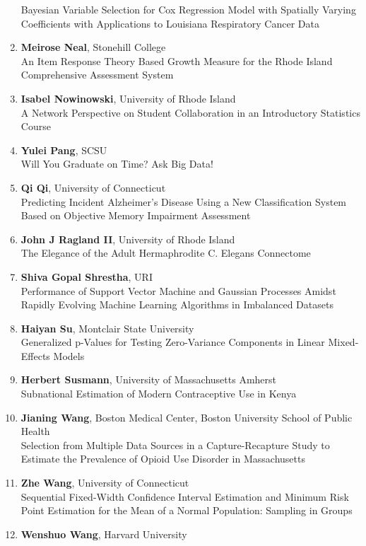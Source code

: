 \begin{enumerate}
Bayesian Variable Selection for Cox Regression Model with Spatially Varying Coefficients with Applications to Louisiana Respiratory Cancer Data
\item \textbf{Meirose Neal}, Stonehill College \\
An Item Response Theory Based Growth Measure for the Rhode Island Comprehensive Assessment System
\item \textbf{Isabel Nowinowski}, University of Rhode Island \\
A Network Perspective on Student Collaboration in an Introductory Statistics Course
\item \textbf{Yulei Pang}, SCSU \\
Will You Graduate on Time? Ask Big Data!
\item \textbf{Qi Qi}, University of Connecticut \\
Predicting Incident Alzheimer's Disease Using a New Classification System Based on Objective Memory Impairment Assessment
\item \textbf{John J Ragland II}, University of Rhode Island \\
The Elegance of the Adult Hermaphrodite C. Elegans Connectome
\item \textbf{Shiva Gopal Shrestha}, URI \\
Performance of Support Vector Machine  and Gaussian Processes Amidst Rapidly Evolving  Machine Learning Algorithms in Imbalanced Datasets
\item \textbf{Haiyan Su}, Montclair State University \\
Generalized p-Values for Testing Zero-Variance Components in Linear Mixed-Effects Models
\item \textbf{Herbert Susmann}, University of Massachusetts Amherst \\
Subnational Estimation of Modern Contraceptive Use in Kenya
\item \textbf{Jianing Wang}, Boston Medical Center, Boston University School of Public Health \\
Selection from Multiple Data Sources in a Capture-Recapture Study to Estimate the Prevalence of Opioid Use Disorder in Massachusetts
\item \textbf{Zhe Wang}, University of Connecticut \\
Sequential Fixed-Width Confidence Interval Estimation and Minimum Risk Point Estimation for the Mean of a Normal Population: Sampling in Groups
\item \textbf{Wenshuo Wang}, Harvard University \\

\end{enumerate}
